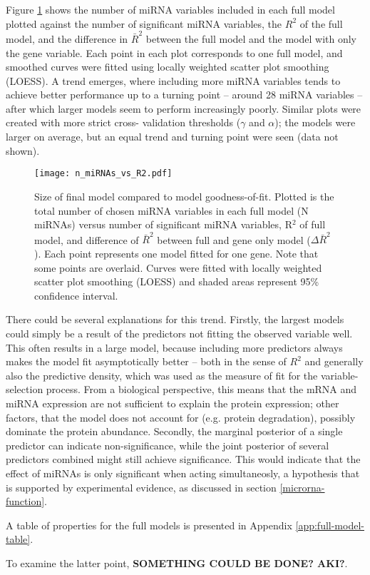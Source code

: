 Figure \ref{n-miRNAs-vs-R2} shows the number of miRNA variables included in
each full model plotted against the number of significant miRNA variables, the
$R^2$ of the full model, and the difference in $\bar{R}^2$ between the full
model and the model with only the gene variable. Each point in each plot
corresponds to one full model, and smoothed curves were fitted using locally
weighted scatter plot smoothing (LOESS). A trend emerges, where including more
miRNA variables tends to achieve better performance up to a turning point --
around 28 miRNA variables -- after which larger models seem to perform
increasingly poorly. Similar plots were created with more strict cross-
validation thresholds ($\gamma$ and $\alpha$); the models were larger on
average, but an equal trend and turning point were seen (data not shown).

\begin{figure}[htb]
  \centering
  \texttt{[image: n\_miRNAs\_vs\_R2.pdf]}
  \caption{Size of final model compared to model goodness-of-fit. Plotted is the total number of chosen miRNA variables in each full model (N miRNAs) versus number of significant miRNA variables, R$^2$ of full model, and difference of $\bar{R}^2$ between full and gene only model ($\Delta\bar{R}^2$). Each point represents one model fitted for one gene. Note that some points are overlaid. Curves were fitted with locally weighted scatter plot smoothing (LOESS) and shaded areas represent 95\% confidence interval. \label{n-miRNAs-vs-R2}}
\end{figure}

There could be several explanations for this trend. Firstly, the largest
models could simply be a result of the predictors not fitting the observed
variable well. This often results in a large model, because including more
predictors always makes the model fit asymptotically better -- both in the
sense of $R^2$ and generally also the predictive density, which was used as
the measure of fit for the variable-selection process. From a biological
perspective, this means that the mRNA and miRNA expression are not sufficient
to explain the protein expression; other factors, that the model does not
account for (e.g. protein degradation), possibly dominate the protein
abundance. Secondly, the marginal posterior of a single predictor can indicate
non-significance, while the joint posterior of several predictors combined
might still achieve significance. This would indicate that the effect of
miRNAs is only significant when acting simultaneosly, a hypothesis that is
supported by experimental evidence, as discussed in section
\ref{microrna-function}.

A table of properties for the full models is presented in Appendix
\ref{app:full-model-table}.

To examine the latter point, \textbf{SOMETHING COULD BE DONE? AKI?}.
